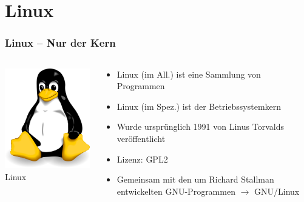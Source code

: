 \documentclass[compress]{beamer}
\begin{document}
\section{Linux}

\begin{frame}
	\frametitle{Linux -- Nur der Kern}
	\begin{columns}[c]
		\column[c]{4cm}
			\includegraphics[scale=0.5]{media/tux.png} \newline
			\huge Linux
		\column{6cm}
			\pause
			\begin{block}{}
				\begin{itemize}
					\item Linux (im All.) ist eine Sammlung von Programmen
					\item Linux (im Spez.) ist der Betriebssystemkern
					\item Wurde ursprünglich 1991 von Linus Torvalds 
						veröffentlicht
					\item Lizenz: GPL2
					\item Gemeinsam mit den um Richard Stallman entwickelten 
						GNU-Programmen $\rightarrow$ GNU/Linux
				\end{itemize}
			\end{block}
	\end{columns}
\end{frame}
\end{document}

